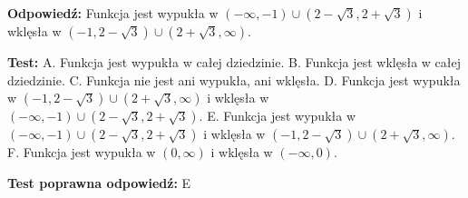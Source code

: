 \documentclass[12pt, a4paper]{article}
\theoremstyle{definition} %
\newcommand{\odpStart}{\noindent \textbf{Odpowiedź:}\newline}    %
\newcommand{\odpStop}{\newline}                                             %
\newcommand{\testStart}{\noindent \textbf{Test:}\newline} %
\newcommand{\testStop}{\newline} %
\newcommand{\kluczStart}{\noindent \textbf{Test poprawna odpowiedź:}\newline} %
\newcommand{\kluczStop}{\newline} %
\begin{document}
\odpStart
Funkcja jest wypukła w $(-\infty,-1)\cup(2-\sqrt{3},2+\sqrt{3})$ i wklęsła w $(-1,2-\sqrt{3})\cup(2+\sqrt{3},\infty)$.
\odpStop

\testStart
A. Funkcja jest wypukła w całej dziedzinie.
B. Funkcja jest wklęsła w całej dziedzinie.
C. Funkcja nie jest ani wypukła, ani wklęsła.
D. Funkcja jest wypukła w $(-1,2-\sqrt{3})\cup(2+\sqrt{3},\infty)$ i wklęsła w $(-\infty,-1)\cup(2-\sqrt{3},2+\sqrt{3})$.
E. Funkcja jest wypukła w $(-\infty,-1)\cup(2-\sqrt{3},2+\sqrt{3})$ i wklęsła w $(-1,2-\sqrt{3})\cup(2+\sqrt{3},\infty)$.
F. Funkcja jest wypukła w $(0,\infty)$ i wklęsła w $(-\infty,0)$.
\testStop

\kluczStart
E
\kluczStop
\end{document}
